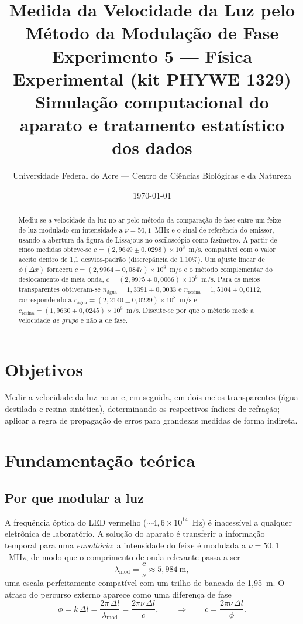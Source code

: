 \documentclass[11pt,a4paper]{article}
\title{\textbf{Medida da Velocidade da Luz pelo Método da Modulação de Fase}\\[2pt]
\large Experimento 5 --- Física Experimental (kit PHYWE 1329)\\[4pt]
\normalsize Simulação computacional do aparato e tratamento estatístico dos dados}
\author{Universidade Federal do Acre --- Centro de Ciências Biológicas e da Natureza}
\date{\today}
\begin{document}
\maketitle

\begin{abstract}
\noindent
Mediu-se a velocidade da luz no ar pelo método da comparação de fase entre um feixe
de luz modulado em intensidade a $\nu = 50{,}1$~MHz e o sinal de referência do
emissor, usando a abertura da figura de Lissajous no osciloscópio como fasímetro.
A partir de cinco medidas obteve-se
$c = (2{,}9649 \pm 0{,}0298)\times 10^{8}$~m/s, compatível com o valor aceito
dentro de 1{,}1 desvios-padrão (discrepância de 1{,}10\%). Um ajuste linear
de $\phi(\Delta x)$ forneceu $c = (2{,}9964 \pm 0{,}0847)\times 10^{8}$~m/s e o
método complementar do deslocamento de meia onda, $c = (2{,}9975 \pm 0{,}0066)\times
10^{8}$~m/s. Para os meios transparentes obtiveram-se
$n_{\text{água}} = 1{,}3391 \pm 0{,}0033$ e
$n_{\text{resina}} = 1{,}5104 \pm 0{,}0112$, correspondendo a
$c_{\text{água}} = (2{,}2140 \pm 0{,}0229)\times10^{8}$~m/s e
$c_{\text{resina}} = (1{,}9630 \pm 0{,}0245)\times10^{8}$~m/s. Discute-se por que
o método mede a velocidade \emph{de grupo} e não a de fase.
\end{abstract}

\section{Objetivos}
Medir a velocidade da luz no ar e, em seguida, em dois meios transparentes
(água destilada e resina sintética), determinando os respectivos índices de
refração; aplicar a regra de propagação de erros para grandezas medidas de
forma indireta.

\section{Fundamentação teórica}

\subsection{Por que modular a luz}
A frequência óptica do LED vermelho ($\sim 4{,}6\times10^{14}$~Hz) é
inacessível a qualquer eletrônica de laboratório. A solução do aparato é
transferir a informação temporal para uma \emph{envoltória}: a intensidade
do feixe é modulada a $\nu = 50{,}1$~MHz, de modo que o comprimento de onda
relevante passa a ser
\begin{equation}
\lambda_{\text{mod}} = \frac{c}{\nu} \approx 5{,}984~\text{m},
\end{equation}
uma escala perfeitamente compatível com um trilho de bancada de 1,95~m.
O atraso do percurso externo aparece como uma diferença de fase
\begin{equation}
\phi = k\,\Delta l = \frac{2\pi\,\Delta l}{\lambda_{\text{mod}}}
     = \frac{2\pi\nu\,\Delta l}{c},
\qquad\Longrightarrow\qquad
c = \frac{2\pi\nu\,\Delta l}{\phi}.
\label{eq:c}
\end{equation}
\end{document}
